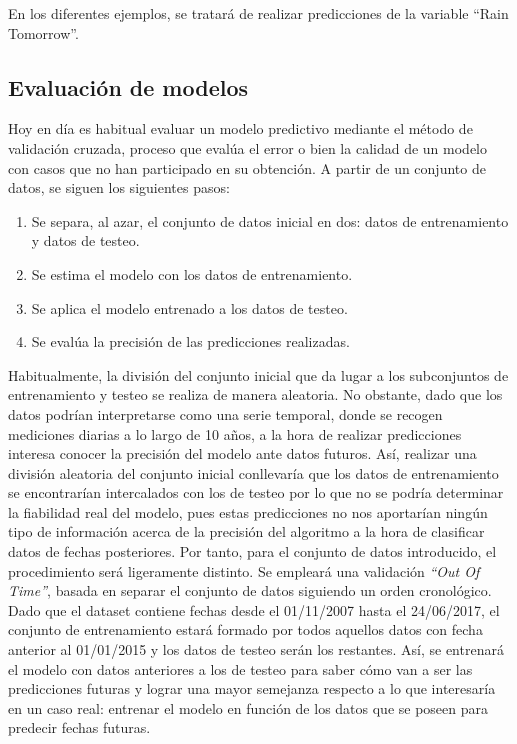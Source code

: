 \documentclass[12pt,twoside]{article}
\begin{document}
En los diferentes ejemplos, se tratará de realizar predicciones de la variable ``Rain Tomorrow''.


\subsection{Evaluación de modelos} \label{subsec:Metodología}

Hoy en día es habitual evaluar un modelo predictivo mediante el método de validación cruzada, proceso que evalúa el error o bien la calidad de un modelo con casos que no han participado en su obtención. A partir de un conjunto de datos, se siguen los siguientes pasos:

\begin{enumerate}
\item Se separa, al azar, el conjunto de datos inicial en dos: datos de entrenamiento y datos de testeo.
\item Se estima el modelo con los datos de entrenamiento.
\item Se aplica el modelo entrenado a los datos de testeo.
\item Se evalúa la precisión de las predicciones realizadas.
\end{enumerate}

Habitualmente, la división del conjunto inicial que da lugar a los subconjuntos de entrenamiento y testeo se realiza de manera aleatoria. No obstante, dado que los datos podrían interpretarse como una serie temporal, donde se recogen mediciones diarias a lo largo de 10 años, a la hora de realizar predicciones interesa conocer la precisión del modelo ante datos futuros.  Así, realizar una división aleatoria del conjunto inicial conllevaría que los datos de entrenamiento se encontrarían intercalados con los de testeo por lo que no se podría determinar la fiabilidad real del modelo, pues estas predicciones no nos aportarían ningún tipo de información acerca de la precisión del algoritmo a la hora de clasificar datos de fechas posteriores. Por tanto, para el conjunto de datos introducido, el procedimiento será ligeramente distinto. Se empleará una validación \textit{``Out Of Time''}, basada en separar el conjunto de datos siguiendo un orden cronológico. Dado que el dataset contiene fechas desde el 01/11/2007 hasta el 24/06/2017, el conjunto de entrenamiento estará formado por todos aquellos datos con fecha anterior al 01/01/2015 y los datos de testeo serán los restantes. Así, se entrenará el modelo con datos anteriores a los de testeo para saber cómo van a ser las predicciones futuras y lograr una mayor semejanza respecto a lo que interesaría en un caso real: entrenar el modelo en función de los datos que se poseen para predecir fechas futuras.
\end{document}
